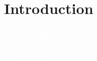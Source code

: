 \section{Introduction}

\begin{frame}
  \frametitle{\textcolor{white}{\bf Introduction}}
  \textcolor{white}{
    \begin{itemize}
        \item write here.
    \end{itemize}
  }
\end{frame}
